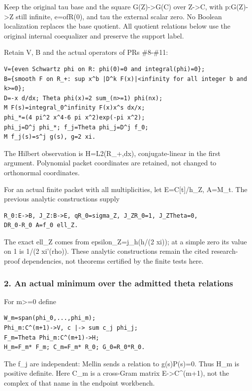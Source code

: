 Keep the original tau base and the square G(Z)-\textgreater G(C) over Z-\textgreater C, with
p:G(Z)-\textgreater Z still infinite, e=ofR(0), and tau the external scalar zero. No Boolean
localization replaces the base quotient. All quotient relations below use the original internal
coequalizer and preserve the support label.

Retain V, B and the actual operators of PRs \#8-\#11:

\begin{verbatim}
V={even Schwartz phi on R: phi(0)=0 and integral(phi)=0};
B={smooth F on R_+: sup x^b |D^k F(x)|<infinity for all integer b and k>=0};
D=-x d/dx; Theta phi(x)=2 sum_(n>=1) phi(nx);
M F(s)=integral_0^infinity F(x)x^s dx/x;
phi_*=(4 pi^2 x^4-6 pi x^2)exp(-pi x^2);
phi_j=D^j phi_*; f_j=Theta phi_j=D^j f_0;
M f_j(s)=s^j g(s), g=2 xi.
\end{verbatim}

The Hilbert observation is H=L2(R\_+,dx), conjugate-linear in the first argument. Polynomial packet
coordinates are retained, not changed to orthonormal coordinates.

For an actual finite packet with all multiplicities, let E=C{[}t{]}/h\_Z, A=M\_t. The previous
analytic constructions supply

\begin{verbatim}
R_0:E->B, J_Z:B->E, qR_0=sigma_Z, J_ZR_0=1, J_ZTheta=0,
DR_0-R_0 A=f_0 ell_Z.
\end{verbatim}

The exact ell\_Z comes from epsilon\_Z=j\_h(h/(2 xi)); at a simple zero its value on 1 is 1/(2
xi'(rho)). These analytic constructions remain the cited research-proof dependencies, not theorems
certified by the finite tests here.

\subsubsection{2. An actual minimum over the admitted theta
relations}\label{pr_13:an-actual-minimum-over-the-admitted-theta-relations}

For m\textgreater=0 define

\begin{verbatim}
W_m=span(phi_0,...,phi_m);
Phi_m:C^(m+1)->V, c |-> sum c_j phi_j;
F_m=Theta Phi_m:C^(m+1)->H;
H_m=F_m* F_m; C_m=F_m* R_0; G_0=R_0*R_0.
\end{verbatim}

The f\_j are independent: Mellin sends a relation to g(s)P(s)=0. Thus H\_m is positive definite.
Here C\_m is a cross-Gram matrix E-\textgreater C\^{}(m+1), not the complex of that name in the
endpoint workbench.


